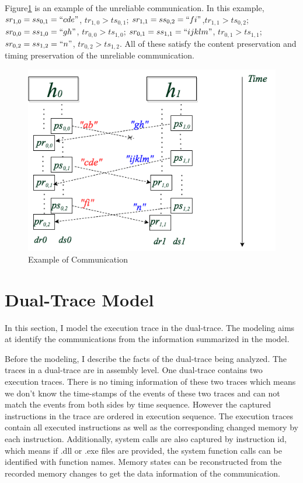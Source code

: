 Figure\ref{unreliableexample} is an example of the unreliable communication. In this example, $sr_{1,0} = ss_{0,1}=``cde"$, $tr_{1,0} > ts_{0,1}$; $sr_{1,1} = ss_{0,2}=``fi"$,$tr_{1,1} > ts_{0,2}$; $sr_{0,0} = ss_{1,0}=``gh"$, $tr_{0,0} > ts_{1,0}$; $sr_{0,1} = ss_{1,1}=``ijklm"$,  $tr_{0,1} > ts_{1,1}$; $sr_{0,2} = ss_{1,2}=``n"$,  $tr_{0,2} > ts_{1,2}$. All of these satisfy the content preservation and timing preservation of the unreliable communication.
\begin{figure}[H]
\centerline{\includegraphics[scale=0.55]{Figures/unreliableexample}}
\caption{Example of Communication}
\label{unreliableexample}
\end{figure}

\section{Dual-Trace Model}
In this section, I model the execution trace in the dual-trace. The modeling aims at identify the communications from the information summarized in the model. 

Before the modeling, I describe the facts of the dual-trace being analyzed. The traces in a dual-trace are in assembly level. One dual-trace contains two execution traces. There is no timing information of these two traces which means we don't know the time-stamps of the events of these two traces and can not match the events from both sides by time sequence. However the captured instructions in the trace are ordered in execution sequence. The execution traces contain all executed instructions as well as the corresponding changed memory by each instruction. Additionally, system calls are also captured by instruction id, which means if .dll or .exe files are provided, the system function calls can be identified with function names. Memory states can be reconstructed from the recorded memory changes to get the data information of the communication. 


